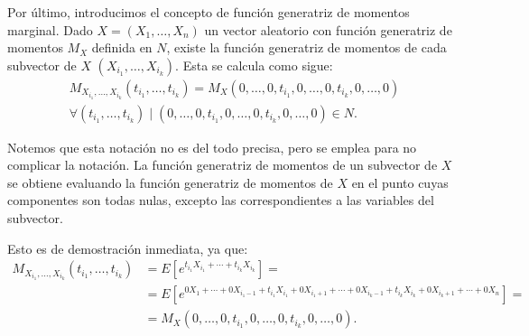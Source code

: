 Por último, introducimos el concepto de función generatriz de momentos marginal. Dado $X=(X_1,\dots,X_n)$ un vector aleatorio con función generatriz de momentos $M_X$ definida en $N$, existe la función generatriz de momentos de cada subvector de $X$ $(X_{i_1},\dots,X_{i_k})$. Esta se calcula como sigue:
\begin{multline*}
    M_{X_{i_1},\dots,X_{i_k}}(t_{i_1},\dots,t_{i_k}) = M_X(0,\dots,0,t_{i_1},0,\dots,0,t_{i_k},0,\dots,0) \\ \forall (t_{i_1},\dots,t_{i_k})\mid (0,\dots,0,t_{i_1},0,\dots,0,t_{i_k},0,\dots,0)\in N.
\end{multline*}
\begin{observacion}
    Notemos que esta notación no es del todo precisa, pero se emplea para no complicar la notación. La función generatriz de momentos de un subvector de $X$ se obtiene evaluando la función generatriz de momentos de $X$ en el punto cuyas componentes son todas nulas, excepto las correspondientes a las variables del subvector.
\end{observacion}
Esto es de demostración inmediata, ya que:
\begin{align*}
    M_{X_{i_1},\dots,X_{i_k}}(t_{i_1},\dots,t_{i_k}) &= E[e^{t_{i_1}X_{i_1}+\cdots+t_{i_k}X_{i_k}}] =\\&= E[e^{0X_1+\cdots+0X_{i_1-1}+t_{i_1}X_{i_1}+0X_{i_1+1}+\cdots+0X_{i_k-1}+t_{i_k}X_{i_k}+0X_{i_k+1}+\cdots+0X_n}] =\\&= M_X(0,\dots,0,t_{i_1},0,\dots,0,t_{i_k},0,\dots,0).
\end{align*}
